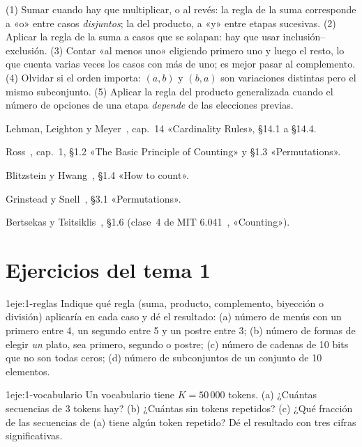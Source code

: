 \begin{observacion}
(1) Sumar cuando hay que multiplicar, o al revés: la regla de la suma corresponde a «o» entre casos \emph{disjuntos}; la del producto, a «y» entre etapas sucesivas. (2) Aplicar la regla de la suma a casos que se solapan: hay que usar inclusión--exclusión. (3) Contar «al menos uno» eligiendo primero uno y luego el resto, lo que cuenta varias veces los casos con más de uno; es mejor pasar al complemento. (4) Olvidar si el orden importa: $(a,b)$ y $(b,a)$ son variaciones distintas pero el mismo subconjunto. (5) Aplicar la regla del producto generalizada cuando el número de opciones de una etapa \emph{depende} de las elecciones previas.
\end{observacion}

\begin{lecturas}
\item Lehman, Leighton y Meyer~\cite{mcs}, cap.~14 «Cardinality Rules», §14.1 a §14.4.
\item Ross~\cite{ross}, cap.~1, §1.2 «The Basic Principle of Counting» y §1.3 «Permutations».
\item Blitzstein y Hwang~\cite{bh}, §1.4 «How to count».
\item Grinstead y Snell~\cite{gs}, §3.1 «Permutations».
\item Bertsekas y Tsitsiklis~\cite{bt}, §1.6 (clase~4 de MIT 6.041~\cite{mit6041f10}, «Counting»).
\end{lecturas}

\section*{Ejercicios del tema 1}

\begin{ejercicio}{1}{eje:1-reglas}
Indique qué regla (suma, producto, complemento, biyección o división) aplicaría en cada caso y dé el resultado: (a) número de menús con un primero entre 4, un segundo entre 5 y un postre entre 3; (b) número de formas de elegir \emph{un} plato, sea primero, segundo o postre; (c) número de cadenas de 10 bits que no son todas ceros; (d) número de subconjuntos de un conjunto de 10 elementos.
\end{ejercicio}

\begin{ejercicio}{1}{eje:1-vocabulario}
Un vocabulario tiene $K=50\,000$ tokens. (a) ¿Cuántas secuencias de 3 tokens hay? (b) ¿Cuántas sin tokens repetidos? (c) ¿Qué fracción de las secuencias de (a) tiene algún token repetido? Dé el resultado con tres cifras significativas.
\end{ejercicio}

